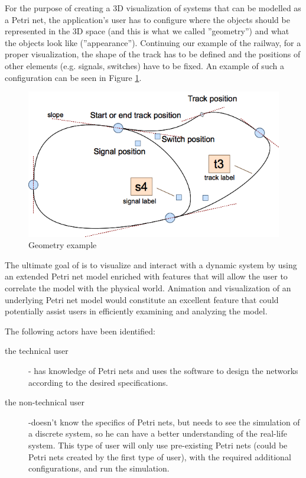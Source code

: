 For the purpose of creating a 3D visualization of systems that can be modelled as a Petri net, the
application's user has to configure where the objects should be represented in the 3D space (and
this is what we called ''geometry'') and what the objects look like (''appearance''). Continuing our
example of the railway, for a proper visualization, the shape of the track has to be defined and the
positions of other elements (e.g. signals, switches) have to be fixed. An example of such a
configuration can be seen in Figure \ref{fig:geometry_example}.

\begin{figure}[htp]
	\begin{center}
		\includegraphics[scale=0.40]{image/geometry_example.png}
		\caption{Geometry example}
		\label{fig:geometry_example}
	\end{center}
\end{figure}

The ultimate goal of \epns is to visualize and interact with a dynamic system by using an
extended Petri net model enriched with features that will allow the user to correlate the model with
the physical world. Animation and visualization of an underlying Petri net model would constitute an
excellent feature that could potentially assist users in efficiently examining and analyzing the
model.

The following actors have been identified:

\begin{description}
    \item[the technical user] - has knowledge of Petri nets and uses the software
    to design the networks according to the desired specifications.
	\item[the non-technical user] -doesn't know the specifics of Petri nets, but needs to see the
	simulation of a discrete system, so he can have a better understanding of the real-life system.
	This type of user will only use pre-existing Petri nets (could be Petri nets created by the first
	type of user), with the required additional configurations, and run the simulation.
\end{description}

